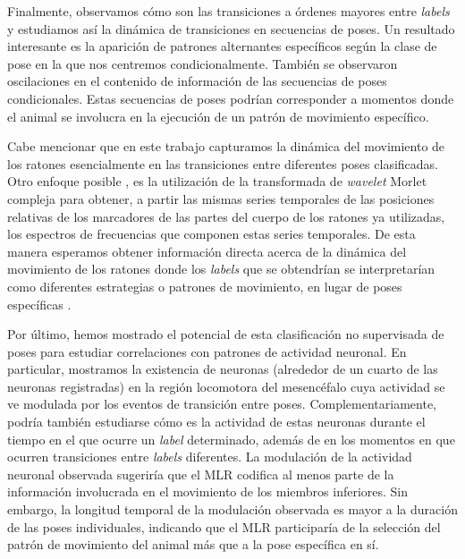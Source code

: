 Finalmente, observamos cómo son las transiciones a órdenes mayores entre \textit{labels} y estudiamos así la dinámica de transiciones en secuencias de poses. Un resultado interesante es la aparición de patrones alternantes específicos según la clase de pose en la que nos centremos condicionalmente. También se observaron oscilaciones en el contenido de información de las secuencias de poses condicionales. Estas secuencias de poses podrían corresponder a momentos donde el animal se involucra en la ejecución de un patrón de movimiento específico. 

Cabe mencionar que en este trabajo capturamos la dinámica del movimiento de los ratones esencialmente en las transiciones entre diferentes poses clasificadas. Otro enfoque posible \cite{berman_mapping, berman_3d}, es la utilización de la transformada de \textit{wavelet} Morlet compleja para obtener, a partir las mismas series temporales de las posiciones relativas de los marcadores de las partes del cuerpo de los ratones ya utilizadas, los espectros de frecuencias que componen estas series temporales. De esta manera esperamos obtener información directa acerca de la dinámica del movimiento de los ratones donde los \textit{labels} que se obtendrían se interpretarían como diferentes estrategias o patrones de movimiento, en lugar de poses específicas \cite{berman_mapping, berman_3d}.

Por último, hemos mostrado el potencial de esta clasificación no supervisada de poses para estudiar correlaciones con patrones de actividad neuronal. En particular, mostramos la existencia de neuronas (alrededor de un cuarto de las neuronas registradas) en la región locomotora del mesencéfalo cuya actividad se ve modulada por los eventos de transición entre poses. Complementariamente, podría también estudiarse cómo es la actividad de estas neuronas durante el tiempo en el que ocurre un \textit{label} determinado, además de en los momentos en que ocurren transiciones entre \textit{labels} diferentes. La modulación de la actividad neuronal observada sugeriría que el MLR codifica al menos parte de la información involucrada en el movimiento de los miembros inferiores. Sin embargo, la longitud temporal de la modulación observada es mayor a la duración de las poses individuales, indicando que el MLR participaría de la selección del patrón de movimiento del animal más que a la pose específica en sí.

